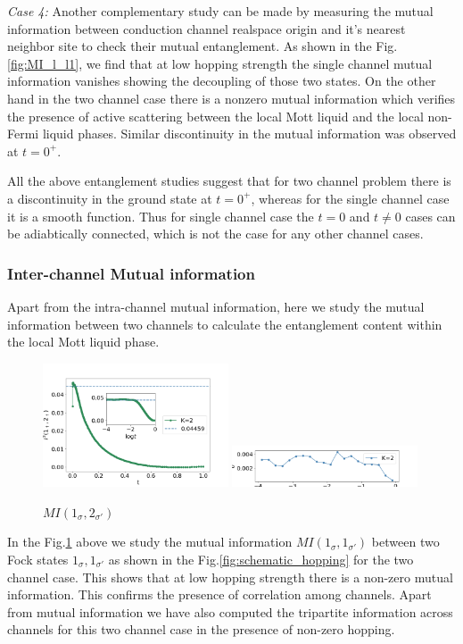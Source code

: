 \documentclass[reprint,prb,superscriptaddress]{revtex4-2}
\begin{document}
\par \textit{Case 4:} Another complementary study can be made by measuring the mutual information between conduction channel realspace origin and it's nearest neighbor site to check their mutual entanglement. As shown in the Fig.\ref{fig:MI_l_l1}, we find that at low hopping strength the single channel mutual information vanishes showing the decoupling of those two states. On the other hand in the two channel case there is a nonzero mutual information which verifies the presence of active scattering between the local Mott liquid and the local non-Fermi liquid phases. Similar discontinuity in the mutual information was observed at $t=0^+$.


\par All the above  entanglement studies suggest that for two channel problem there is a discontinuity in the ground state at $t=0^{+}$, whereas for the single channel case it is a smooth function. Thus for single channel case the $t=0$ and $t\neq 0$ cases can be adiabtically connected, which is not the case for any other channel cases. 


\subsubsection{Inter-channel Mutual information}
Apart from the intra-channel mutual information, here we study the mutual information between two channels to calculate the entanglement content within the local Mott liquid phase.
\begin{figure}
\includegraphics[width=0.49\textwidth]{plt/A_I2_ch2_[1,3]}
\includegraphics[width=0.49\textwidth]{plt/errorbar_A_I2_ch2_[1,3]}
\caption{$MI(1_{\sigma},2_{\sigma'})$}
\label{fig:MI_1_2}
\end{figure}
In the Fig.\ref{fig:MI_1_2} above we study the mutual information $MI(1_{\sigma},1_{\sigma'})$ between two Fock states $1_{\sigma},1_{\sigma'}$ as shown in the Fig.\ref{fig:schematic_hopping} for the two channel case. This shows that at low hopping strength there is a non-zero mutual information. This confirms the presence of correlation among channels. Apart from mutual information we have also computed the tripartite information across channels for this two channel case in the presence of non-zero hopping.
\end{document}
